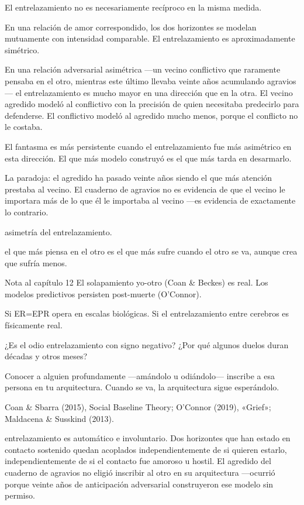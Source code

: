 \noindent El entrelazamiento no es necesariamente recíproco en la misma medida.

En una relación de amor correspondido, los dos horizontes se modelan mutuamente con intensidad comparable. El entrelazamiento es aproximadamente simétrico.

En una relación adversarial asimétrica —un vecino conflictivo que raramente pensaba en el otro, mientras este último llevaba veinte años acumulando agravios— el entrelazamiento es mucho mayor en una dirección que en la otra. El vecino agredido modeló al conflictivo con la precisión de quien necesitaba predecirlo para defenderse. El conflictivo modeló al agredido mucho menos, porque el conflicto no le costaba.

El fantasma es más persistente cuando el entrelazamiento fue más asimétrico en esta dirección. El que más modelo construyó es el que más tarda en desarmarlo.

La paradoja: el agredido ha pasado veinte años siendo el que más atención prestaba al vecino. El cuaderno de agravios no es evidencia de que el vecino le importara más de lo que él le importaba al vecino —es evidencia de exactamente lo contrario.

\begin{fisica}
 asimetría del entrelazamiento.

 el que más piensa en el otro es el que más sufre cuando el otro se va, aunque crea que sufría menos.
\end{fisica}
\begin{notacap}{Nota al capítulo 12}
 El solapamiento yo-otro (Coan \& Beckes) es real. Los modelos predictivos persisten post-muerte (O’Connor).

 Si ER=EPR opera en escalas biológicas. Si el entrelazamiento entre cerebros es físicamente real.

 ¿Es el odio entrelazamiento con signo negativo? ¿Por qué algunos duelos duran décadas y otros meses?

 Conocer a alguien profundamente —amándolo u odiándolo— inscribe a esa persona en tu arquitectura. Cuando se va, la arquitectura sigue esperándolo.

 Coan \& Sbarra (2015), Social Baseline Theory; O’Connor (2019), «Grief»; Maldacena \& Susskind (2013).
\end{notacap}
\noindent {} entrelazamiento es automático e involuntario. Dos horizontes que han estado en contacto sostenido quedan acoplados independientemente de si quieren estarlo, independientemente de si el contacto fue amoroso u hostil. El agredido del cuaderno de agravios no eligió inscribir al otro en su arquitectura —ocurrió porque veinte años de anticipación adversarial construyeron ese modelo sin permiso.


